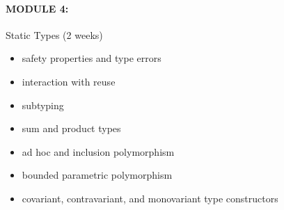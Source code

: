 \documentclass[11pt]{article}
\begin{document}
\paragraph{MODULE 4:}
%
Static Types (2 weeks)
%
\begin{itemize}
\item safety properties and type errors
\item interaction with reuse
\item subtyping
\item sum and product types
\item ad hoc and inclusion polymorphism
\item bounded parametric polymorphism
\item covariant, contravariant, and monovariant type constructors
\end{itemize}
\end{document}
